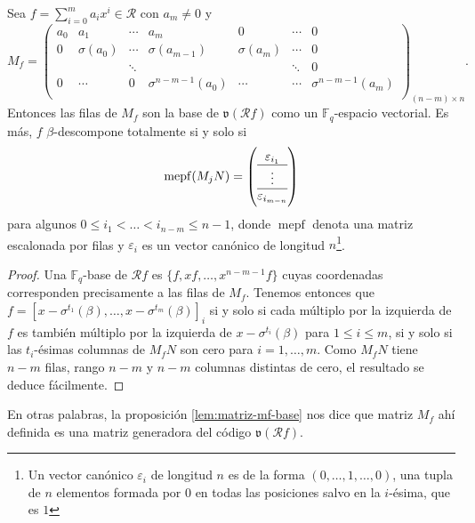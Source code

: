\begin{lemma}
  \label{lem:matriz-mf-base}
  Sea \(f = \sum_{i=0}^m a_ix^i \in \mathcal R\) con \(a_m \neq 0\) y
  \[
    M_f = \begin{pmatrix}
      a_0 & a_1 & \cdots & a_m & 0 & \cdots & 0 \\
      0 & \sigma(a_0) & \cdots & \sigma(a_{m-1}) & \sigma(a_m) & \cdots & 0 \\
       &  & \ddots &  &  & \ddots & 0 \\
      0 & \cdots & 0 & \sigma^{n-m-1}(a_0) & \cdots & \cdots & \sigma^{n-m-1}(a_m) \\
    \end{pmatrix}_{(n-m) \times n}.
  \]
  Entonces las filas de \(M_f\) son la base de \(\mathfrak v(\mathcal Rf)\) como un \(\mathbb F_q\)-espacio vectorial.
  Es más, \(f\) \(\beta\)-descompone totalmente si y solo si 
  \[
    \operatorname{mepf}(M_jN) = \left( \begin{array}{@{}c@{}}
      \varepsilon_{i_1}\\\hline
      \vdots\\\hline
      \varepsilon_{i_{m-n}}
    \end{array}\right)
  \]
  para algunos \(0 \leq i_1 < \dots < i_{n-m} \leq n -1\), donde \(\operatorname{mepf}\) denota una matriz escalonada por filas y \(\varepsilon_i\) es un vector canónico de longitud \(n\)\footnote{Un vector canónico \(\varepsilon_i\) de longitud \(n\) es de la forma \((0, \dots, 1, \dots, 0)\), una tupla de \(n\) elementos formada por \(0\) en todas las posiciones salvo en la \(i\)-ésima, que es \(1\)}.
\end{lemma}
\begin{proof}
  Una \(\mathbb F_q\)-base de \(\mathcal Rf\) es \(\{f, xf, \dots, x^{n-m-1}f\}\) cuyas coordenadas corresponden precisamente a las filas de \(M_f\).
  Tenemos entonces que \(f = \left[x - \sigma^{t_1}(\beta), \dots, x - \sigma^{t_m}(\beta)\right]_i\) si y solo si cada múltiplo por la izquierda de \(f\) es también múltiplo por la izquierda de \(x - \sigma^{t_i}(\beta)\) para \(1 \leq i \leq m\), si y solo si las \(t_i\)-ésimas columnas de \(M_fN\) son cero para \(i = 1, \dots, m\).
  Como \(M_fN\) tiene \(n - m\) filas, rango \(n - m\) y \(n - m\) columnas distintas de cero, el resultado se deduce fácilmente.
\end{proof}

En otras palabras, la proposición \ref{lem:matriz-mf-base} nos dice que matriz \(M_f\) ahí definida es una matriz generadora del código \(\mathfrak v(\mathcal R f)\).

